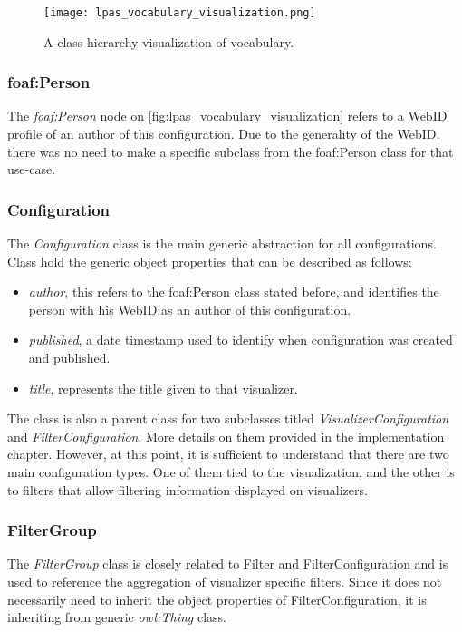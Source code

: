 \begin{figure}[h]
\centering
\texttt{[image: lpas\_vocabulary\_visualization.png]}
\caption{A class hierarchy visualization of \lpa{} vocabulary.}
\label{fig:lpas_vocabulary_visualization}
\end{figure}

\subsubsection{foaf:Person}

The \textit{foaf:Person} node on \autoref{fig:lpas_vocabulary_visualization} refers to a WebID profile of an author of this configuration. Due to the generality of the WebID, there was no need to make a specific subclass from the foaf:Person class for that use-case.

\subsubsection{Configuration}
\label{ssssec:configuration}

The \textit{Configuration} class is the main generic abstraction for all \lpa{} configurations. Class hold the generic object properties that can be described as follows:
\begin{itemize}
	\item \textit{author}, this refers to the foaf:Person class stated before, and identifies the person with his WebID as an author of this \lpa{} configuration.
	\item \textit{published}, a date timestamp used to identify when configuration was created and published.
	\item \textit{title}, represents the title given to that \lpa{} visualizer.
\end{itemize}

The class is also a parent class for two subclasses titled \textit{VisualizerConfiguration} and \textit{FilterConfiguration}. More details on them provided in the implementation chapter. However, at this point, it is sufficient to understand that there are two main configuration types. One of them tied to the visualization, and the other is to filters that allow filtering information displayed on visualizers.

\subsubsection{FilterGroup}

The \textit{FilterGroup} class is closely related to Filter and FilterConfiguration and is used to reference the aggregation of visualizer specific filters. Since it does not necessarily need to inherit the object properties of FilterConfiguration, it is inheriting from generic \textit{owl:Thing} class.


